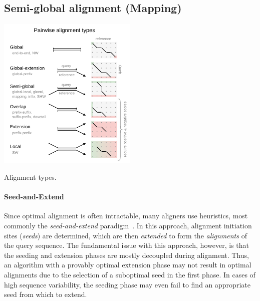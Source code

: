 \subsection{Semi-global alignment (Mapping)}

\begin{floatingfigure}[l]{0.5\textwidth}
    \includegraphics[width=0.5\textwidth]{alignment-types}
	\caption[Alignment types]{Alignment types.}
    \label{fig:alignment-types}
\end{floatingfigure}

\paragraph{Seed-and-Extend}
Since optimal alignment is often intractable, many aligners use heuristics, most
commonly the \emph{seed-and-extend}
paradigm~\cite{altschul_basic_1990,langmead_fast_2012,li_fast_2009}. In this
approach, alignment initiation sites (\emph{seeds}) are determined, which are
then \emph{extended} to form the \emph{alignments} of the query sequence. The
fundamental issue with this approach, however, is that the seeding and extension
phases are mostly decoupled during alignment. Thus, an algorithm with a provably
optimal extension phase may not result in optimal alignments due to the
selection of a suboptimal seed in the first phase. In cases of high sequence
variability, the seeding phase may even fail to find an appropriate seed from
which to extend.
